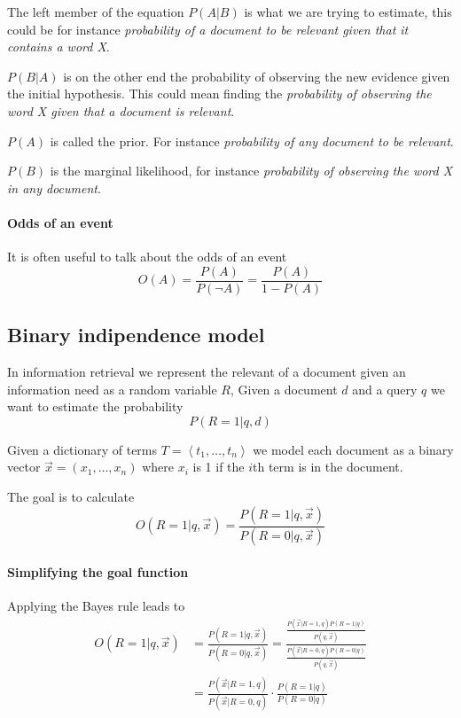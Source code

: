 The left member of the equation $P(A|B)$ is what we are trying to estimate, 
this could be for instance \emph{probability of a document to be relevant 
given that it contains a word X}.

$P(B|A)$ is on the other end the probability of observing the new evidence 
given the initial hypothesis. This could mean finding the \emph{probability 
of observing the word X given that a document is relevant}. 

$P(A)$ is called the prior. For instance \emph{probability of any document to 
be relevant}.

$P(B)$ is the marginal likelihood, for instance \emph{probability of observing 
the word X in any document}.

\paragraph{Odds of an event}
It is often useful to talk about the odds of an event 
$$O(A) = \frac{P(A)}{P(\neg A)} = \frac{P(A)}{1 - P(A)}$$



\subsection{Binary indipendence model}
\label{binary-ind}

In information retrieval we represent the relevant of a document 
given an information need as a random variable $R$, Given a document $d$
and a query $q$ we want to estimate the probability $$P(R = 1 |q, d)$$

Given a dictionary of terms $T = \left\langle t_1, \dots, t_n \right\rangle $ 
we model each document as a binary vector $\vec{x} = (x_1, \dots, x_n)$
where $x_i$ is 1 if the $i$th term is in the document.

The goal is to calculate 
$$O(R=1 | q, \vec{x}) = \frac{P(R=1|q, \vec{x})}{P(R=0|q, \vec{x})}$$

\paragraph{Simplifying the goal function}
Applying the Bayes rule leads to
\begin{equation}
    \begin{aligned}
        O(R=1 | q, \vec{x}) &= \frac{P(R=1|q, \vec{x})}{P(R=0|q, \vec{x})}
        = \frac{\frac{P(\vec{x}|R=1,q)P(R=1|q)}{P(q, \vec{x})}}{\frac{P(\vec{x}|R=0,q)P(R=0|q)}{P(q, \vec{x})}}\\
        &= \frac{P(\vec{x}| R = 1, q)}{P(\vec{x}| R = 0, q)}\cdot\frac{P(R=1|q)}{P(R=0|q)}
    \end{aligned}
\end{equation}

